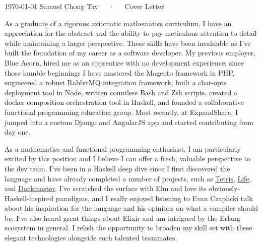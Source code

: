 \documentclass[11pt, a4paper]{awesome-cv}
\begin{document}
\makecvheader

\makecvfooter
  {\today}
  {Samuel Chong Tay~~~·~~~Cover Letter}
  {}

\makelettertitle

\begin{cvletter}

As a graduate of a rigorous axiomatic mathematics curriculum, I have an
  appreciation for the abstract and the ability to pay meticulous attention to
  detail while maintaining a larger perspective.  These skills have been
  invaluable as I've built the foundation of my career as a software developer.
  My previous employer, Blue Acorn, hired me as an apprentice with no
  development experience; since those humble beginnings I have mastered the
  Magento framework in PHP, engineered a robust RabbitMQ integration framework,
  built a chat-opts deployment tool in Node, written countless Bash and Zsh
  scripts, created a docker composition orchestration tool in Haskell, and
  founded a collaborative functional programming education group.  Most
  recently, at ExpandShare, I jumped into a custom Django and
  AngularJS app and started contributing from day one.

As a mathematics and functional programming enthusiast, I am particularly
  excited by this position and I believe I can offer a fresh, valuable
  perspective to the dev team.  I've been in a Haskell deep dive since I first
  discovered the language and have already completed a number of projects, such
  as \underline{\href{https://github.com/samtay/tetris}{Tetris}},
  \underline{\href{https://github.com/samtay/conway}{Life}}, and
  \underline{\href{https://github.com/samtay/dockmaster}{Dockmaster}}.
  I've scratched the surface with Elm and love its obviously-Haskell-inspired
  paradigms, and I really enjoyed listening to Evan Czaplicki talk about his
  inspiration for the language and his opinions on what a compiler should be.
  I've also heard great things about Elixir and am intrigued by the Erlang
  ecosystem in general. I relish the opportunity to broaden my skill set with
  these elegant technologies alongside such talented teammates.


\end{cvletter}
\end{document}
